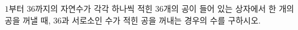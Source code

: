 \hspace*{2mm}\begin{minipage}[t]{\dimexpr\linewidth-2mm\relax}\vspace{0pt}
$1$부터 $36$까지의 자연수가 각각 하나씩 적힌 $36$개의 공이 들어 있는 상자에서 한 개의 공을 꺼낼 때, $36$과 서로소인 수가 적힌 공을 꺼내는 경우의 수를 구하시오.\end{minipage}
